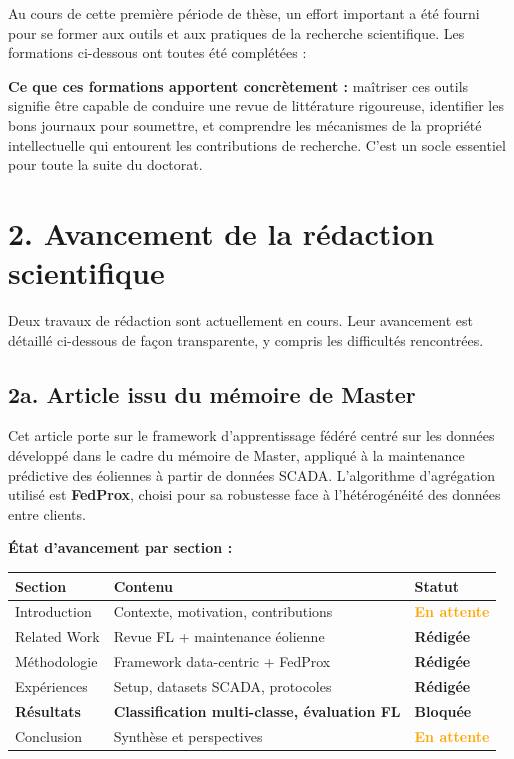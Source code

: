 \documentclass[12pt, a4paper]{report}
\begin{document}
Au cours de cette première période de thèse, un effort important a été fourni pour
se former aux outils et aux pratiques de la recherche scientifique. Les formations
ci-dessous ont toutes été complétées :

\begin{infobox}
\textbf{Ce que ces formations apportent concrètement :} maîtriser ces outils signifie
être capable de conduire une revue de littérature rigoureuse, identifier les bons journaux
pour soumettre, et comprendre les mécanismes de la propriété intellectuelle qui entourent
les contributions de recherche. C'est un socle essentiel pour toute la suite du doctorat.
\end{infobox}

\section*{2. Avancement de la rédaction scientifique}

Deux travaux de rédaction sont actuellement en cours. Leur avancement est détaillé
ci-dessous de façon transparente, y compris les difficultés rencontrées.

\subsection*{2a. Article issu du mémoire de Master}

Cet article porte sur le framework d'apprentissage fédéré centré sur les données
développé dans le cadre du mémoire de Master, appliqué à la maintenance prédictive
des éoliennes à partir de données SCADA. L'algorithme d'agrégation utilisé est
\textbf{FedProx}, choisi pour sa robustesse face à l'hétérogénéité des données
entre clients.

\textbf{État d'avancement par section :}

\begin{table}[h!]
\centering
\renewcommand{\arraystretch}{1.5}
\begin{tabularx}{\textwidth}{lXl}
\toprule
Section & Contenu & Statut \\
\midrule
Introduction & Contexte, motivation, contributions & \textcolor{orange}{\textbf{En attente}} \\
Related Work & Revue FL + maintenance éolienne & \textcolor{green!60!black}{\textbf{Rédigée}} \\
Méthodologie & Framework data-centric + FedProx & \textcolor{green!60!black}{\textbf{Rédigée}} \\
Expériences & Setup, datasets SCADA, protocoles & \textcolor{green!60!black}{\textbf{Rédigée}} \\
\textbf{Résultats} & \textbf{Classification multi-classe, évaluation FL} & \textcolor{gapred}{\textbf{Bloquée}} \\
Conclusion & Synthèse et perspectives & \textcolor{orange}{\textbf{En attente}} \\
\bottomrule
\end{tabularx}
\end{table}
\end{document}
